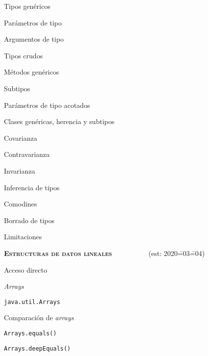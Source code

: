 \begin{longenum}
\begin{longenum}
        \item Tipos genéricos
        \begin{longenum}
            \item Parámetros de tipo
            \item Argumentos de tipo
            \item Tipos crudos
        \end{longenum}
        \item Métodos genéricos
        \item Subtipos
        \begin{longenum}
            \item Parámetros de tipo acotados
            \item Clases genéricas, herencia y subtipos
            \begin{longenum}
                \item Covarianza
                \item Contravarianza
                \item Invarianza
            \end{longenum}
        \end{longenum}
        \item Inferencia de tipos
        \item Comodines
        \item Borrado de tipos
        \item Limitaciones
    \end{longenum}
    \item \textbf{\textsc{Estructuras de datos lineales}} \ \ \ \ \ \ \ \ \ \ (est: 2020\==03\==04)
    \begin{longenum}
        \item Acceso directo
        \begin{longenum}
            \item \textit{Arrays}
            \item \texttt{java.util.Arrays}
            \begin{longenum}
                \item Comparación de \textit{arrays}
                \begin{longenum}
                    \item \texttt{Arrays.equals()}
                    \item \texttt{Arrays.deepEquals()}
                \end{longenum}

\end{longenum}
\end{longenum}
\end{longenum}
\end{longenum}

